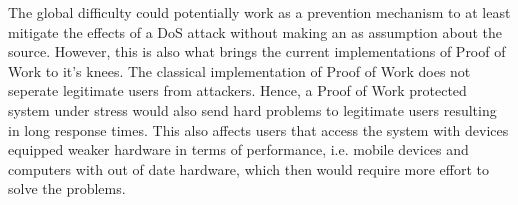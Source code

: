 The global difficulty could potentially work as a prevention mechanism to at least mitigate the effects of a DoS attack without making an as assumption about the source. However, this is also what brings the current implementations of Proof of Work to it's knees. The classical implementation of Proof of Work does not seperate legitimate users from attackers. Hence, a Proof of Work protected system under stress would also send hard problems to legitimate users resulting in long response times. This also affects users that access the system with devices equipped weaker hardware in terms of performance, i.e. mobile devices and computers with out of date hardware, which then would require more effort to solve the problems. 